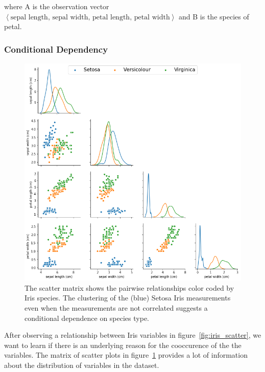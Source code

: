 \documentclass[letterpaper,onecolumn,titlepage]{Ythesis}
\begin{document}
where A is the observation vector $\left< \text{sepal length, sepal width, petal length, petal width} \right>$ and B is the species of petal. 

\subsubsection{Conditional Dependency}
\label{sec:condep}
\begin{figure}[H]
\center
\includegraphics[width=1\textwidth]{intro/iris_observations.png}
\caption{The scatter matrix shows the pairwise relationships color coded by Iris species. The clustering of the (blue) Setosa Iris measurements even when the measurements are not correlated suggests a conditional dependence on species type.}
\label{fig:iris_observations}
\end{figure}
After observing a relationship between Iris variables in figure~\ref{fig:iris_scatter}, we want to learn if there is an underlying reason for the cooccurence of the the variables. The matrix of scatter plots \cite{elmqvist_rolling_2008,l._wilkinson_high-dimensional_2006} in figure~\ref{fig:iris_observations} provides a lot of information about the distribution of variables in the dataset. 
\end{document}
